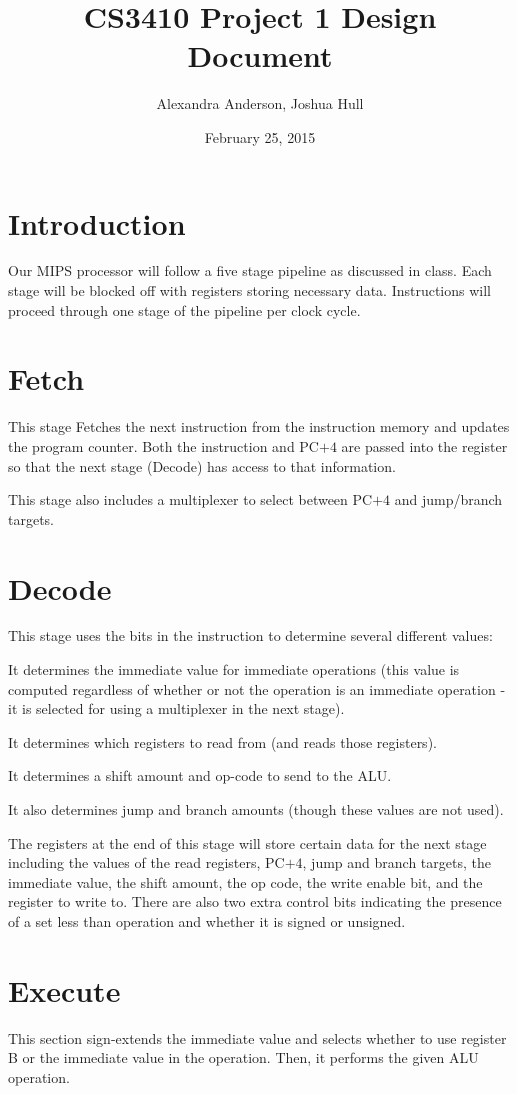 \documentclass{article}
\title{CS3410 Project 1 Design Document}
\date{February 25, 2015}
\author{Alexandra Anderson, Joshua Hull}
\begin{document}
\maketitle

\section*{Introduction}
Our MIPS processor will follow a five stage pipeline as discussed in class.  Each stage will be blocked off with registers storing necessary data.  Instructions will proceed through one stage of the pipeline per clock cycle.

\section*{Fetch}
This stage Fetches the next instruction from the instruction memory and updates the program counter.  Both the instruction and PC$+4$ are passed into the register so that the next stage (Decode) has access to that information.  

This stage also includes a multiplexer to select between PC$+4$ and jump/branch targets.  

\section*{Decode}
This stage uses the bits in the instruction to determine several different values:

It determines the immediate value for immediate operations (this value is computed regardless of whether or not the operation is an immediate operation - it is selected for using a multiplexer in the next stage).

It determines which registers to read from (and reads those registers).

It determines a shift amount and op-code to send to the ALU.

It also determines jump and branch amounts (though these values are not used).

The registers at the end of this stage will store certain data for the next stage including the values of the read registers, PC$+4$, jump and branch targets, the immediate value, the shift amount, the op code, the write enable bit, and the register to write to. There are also two extra control bits indicating the presence of a set less than operation and whether it is signed or unsigned. 

\section*{Execute}
This section sign-extends the immediate value and selects whether to use register B or the immediate value in the operation.  Then, it performs the given ALU operation.
\end{document}

